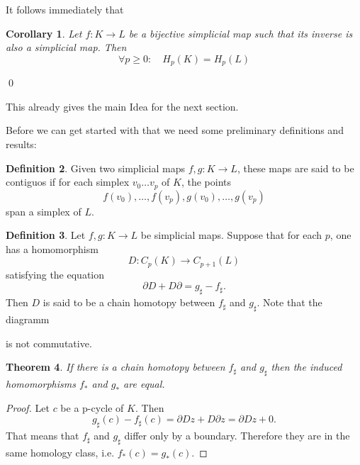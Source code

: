 \documentclass[draft,toc=bib]{scrartcl}
\theoremstyle{plain}
\newtheorem{theorem}{Theorem}[section]
\newtheorem{corollary}[theorem]{Corollary}
\theoremstyle{definition}
\newtheorem	{definition}[theorem]{Definition}
\theoremstyle{remark}
\begin{document}
It follows immediately that
\begin{corollary}\label{baby-case}
	Let $f: K\to L$ be a bijective simplicial map such that its inverse is also a simplicial map. Then \[
	\forall p\geq 0:\quad H_p(K)=H_p(L)
	\]
\end{corollary}\qed

This already gives the main Idea for the next section.

Before we can get started with that we need some preliminary definitions and results:

\begin{definition}%
	Given two simplicial maps $f,g: K\to L$, these maps are said to be contiguos if for each simplex $v_0\dots v_p$ of $K$, the points \[
		f(v_0),\dots,f(v_p),g(v_0),\dots,g(v_p)
		\] span a simplex of $L$.
\end{definition}

\begin{definition}
	Let $f,g:K\to L$ be simplicial maps. Suppose that for each $p$, one has a homomorphism \[
	D: C_p(K)\to C_{p+1}(L)
	\] satisfying the equation
	\[
	\partial D+D\partial=g_\sharp-f_\sharp.
	\]
	Then $D$ is said to be a chain homotopy between $f_\sharp$ and $g_\sharp$. Note that the diagramm
	\begin{center}
		
\end{center}
is not commutative.
\end{definition}

\begin{theorem}\label{chain_hom->invariant}%
	If there is a chain homotopy between $f_\sharp$ and $g_\sharp$ then the induced homomorphisms $f_\ast$ and $g_\ast$ are equal.
\end{theorem}

\begin{proof}
	Let $c$ be a p-cycle of $K$. Then
	\[
	g_\sharp(c)-f_\sharp(c)=\partial Dz+D\partial z=\partial Dz+0.
	\]
	That means that $f_\sharp$ and $g_\sharp$ differ only by a boundary. Therefore they are in the same homology class, i.e. $f_\ast(c)=g_\ast(c)$.
\end{proof}
\end{document}

